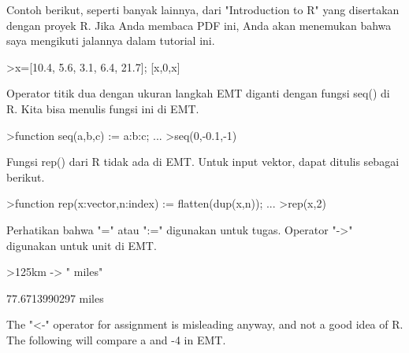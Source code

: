 \documentclass[a4paper,10pt]{article}
\begin{document}
\begin{eulernotebook}
\begin{eulercomment}
\begin{eulercomment}
\begin{eulercomment}
\begin{eulercomment}
\begin{eulercomment}
\begin{eulercomment}
\begin{eulercomment}
\begin{eulercomment}
\begin{eulercomment}
\begin{eulercomment}
\begin{eulercomment}
\begin{eulercomment}
\begin{eulercomment}
\begin{eulercomment}
\begin{eulercomment}
\begin{eulercomment}
\begin{eulercomment}
\begin{eulercomment}
\begin{eulercomment}
Contoh berikut, seperti banyak lainnya, dari "Introduction to R" yang
disertakan dengan proyek R. Jika Anda membaca PDF ini, Anda akan
menemukan bahwa saya mengikuti jalannya dalam tutorial ini.
\end{eulercomment}
\begin{eulerprompt}
>x=[10.4, 5.6, 3.1, 6.4, 21.7]; [x,0,x]
\end{eulerprompt}
\begin{euleroutput}
  [10.4,  5.6,  3.1,  6.4,  21.7,  0,  10.4,  5.6,  3.1,  6.4,  21.7]
\end{euleroutput}
\begin{eulercomment}
Operator titik dua dengan ukuran langkah EMT diganti dengan fungsi
seq() di R. Kita bisa menulis fungsi ini di EMT.
\end{eulercomment}
\begin{eulerprompt}
>function seq(a,b,c) := a:b:c; ...
>seq(0,-0.1,-1)
\end{eulerprompt}
\begin{euleroutput}
  [0,  -0.1,  -0.2,  -0.3,  -0.4,  -0.5,  -0.6,  -0.7,  -0.8,  -0.9,  -1]
\end{euleroutput}
\begin{eulercomment}
Fungsi rep() dari R tidak ada di EMT. Untuk input vektor, dapat
ditulis sebagai berikut.
\end{eulercomment}
\begin{eulerprompt}
>function rep(x:vector,n:index) := flatten(dup(x,n)); ...
>rep(x,2)
\end{eulerprompt}
\begin{euleroutput}
  [10.4,  5.6,  3.1,  6.4,  21.7,  10.4,  5.6,  3.1,  6.4,  21.7]
\end{euleroutput}
\begin{eulercomment}
Perhatikan bahwa "=" atau ":=" digunakan untuk tugas. Operator "-\textgreater{}"
digunakan untuk unit di EMT.
\end{eulercomment}
\begin{eulerprompt}
>125km -> " miles"
\end{eulerprompt}
\begin{euleroutput}
  77.6713990297 miles
\end{euleroutput}
\begin{eulercomment}
The "\textless{}-" operator for assignment is misleading anyway, and not a good
idea of R. The following will compare a and -4 in EMT.
\end{eulercomment}
\begin{eulerprompt}

\end{eulerprompt}
\end{eulercomment}
\end{eulercomment}
\end{eulercomment}
\end{eulercomment}
\end{eulercomment}
\end{eulercomment}
\end{eulercomment}
\end{eulercomment}
\end{eulercomment}
\end{eulercomment}
\end{eulercomment}
\end{eulercomment}
\end{eulercomment}
\end{eulercomment}
\end{eulercomment}
\end{eulercomment}
\end{eulercomment}
\end{eulercomment}
\end{eulernotebook}
\end{document}
